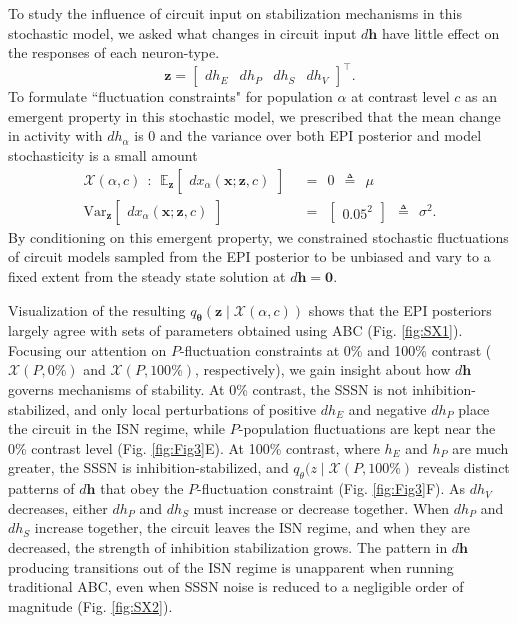 \documentclass[11pt]{article}
\begin{document}
To study the influence of circuit input on stabilization mechanisms in this stochastic model, we asked what changes in circuit input $d\mathbf{h}$ have little effect on the responses of each neuron-type.
\begin{equation}
\mathbf{z} = \begin{bmatrix} dh_E & dh_P & dh_S & dh_V \end{bmatrix}^{\top}.
\end{equation}
To formulate ``fluctuation constraints" for population $\alpha$  at contrast level $c$ as an emergent property in this stochastic model, we prescribed that the mean change in activity with $dh_\alpha$ is 0 and the variance over both EPI posterior and model stochasticity is a small amount
\begin{equation}\label{eq:EP}
\begin{split}
\mathcal{X}(\alpha, c) ~~:~~  \mathbb{E}_{\mathbf{z}}\begin{bmatrix} dx_\alpha(\mathbf{x}; \mathbf{z},c) \end{bmatrix}  &~~=~~  0  ~~\triangleq~~ \mu  \\ 
\text{Var}_{\mathbf{z}}\begin{bmatrix} dx_\alpha(\mathbf{x}; \mathbf{z},c) \end{bmatrix}  &~~=~~  \begin{bmatrix} 0.05^2 \end{bmatrix} ~~\triangleq~~ \sigma^2 .
\end{split}
\end{equation}
By conditioning on this emergent property, we constrained stochastic fluctuations of circuit models sampled from the EPI posterior to be unbiased and vary to a fixed extent from the steady state solution at $d\mathbf{h}=\mathbf{0}$.

Visualization of the resulting $q_{\bm{\theta}}(\mathbf{z} \mid \mathcal{X}(\alpha, c))$ shows that the EPI posteriors largely agree with sets of parameters obtained using ABC (Fig. \ref{fig:SX1}).
Focusing our attention on $P$-fluctuation constraints at 0\% and 100\% contrast ($\mathcal{X}(P, 0\%)$ and $\mathcal{X}(P, 100\%)$, respectively), we gain insight about how $d\mathbf{h}$ governs mechanisms of stability.  
At 0\% contrast, the SSSN is not inhibition-stabilized, and only local perturbations of positive $dh_E$ and negative $dh_P$ place the circuit in the ISN regime, while $P$-population fluctuations are kept near the 0\% contrast level (Fig. \ref{fig:Fig3}E).
At 100\% contrast, where $h_E$ and $h_P$ are much greater, the SSSN is inhibition-stabilized, and $q_\theta(z \mid \mathcal{X}(P, 100\%)$ reveals distinct patterns of $d\mathbf{h}$ that obey the $P$-fluctuation constraint (Fig. \ref{fig:Fig3}F).
As $dh_V$ decreases, either $dh_P$ and $dh_S$ must increase or decrease together.  When $dh_P$ and $dh_S$ increase together, the circuit leaves the ISN regime, and when they are decreased, the strength of inhibition stabilization grows.
The pattern in $d\mathbf{h}$ producing transitions out of the ISN regime is unapparent when running traditional ABC, even when SSSN noise is reduced to a negligible order of magnitude (Fig. \ref{fig:SX2}).
\end{document}
